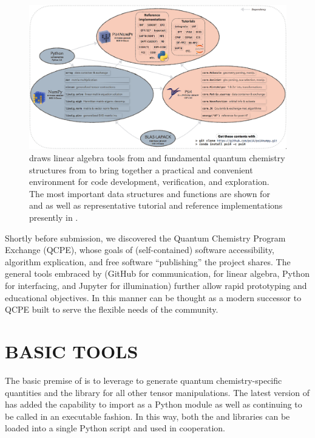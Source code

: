 \documentclass[%
  class = book,%
  crop = false,%
  float = true,%
  multi = true,%
  preview = false,%
]{standalone}
\let\cite\autocite
\newcommand{\caps}[1]{\uppercase{#1}}
\begin{document}
\begin{figure}
  \centering
  \includegraphics[width=\textwidth]{fig1.png}
  \caption[Location of \pfn within the scientific computing ecosystem]{\pfn draws linear algebra tools from \numpy and fundamental quantum chemistry structures from \pfour to bring together a practical and convenient environment for code development, verification, and exploration. The most important data structures and functions are shown for \numpy and \pfour as well as representative tutorial and reference implementations presently in \pfn.}
  \label{fig:ovalorg}
\end{figure}

Shortly before submission, we discovered the Quantum Chemistry Program Exchange (QCPE)\cite{QCPE,Boyd:2013:221}, whose goals of (self-contained) software accessibility, algorithm explication, and free software ``publishing'' the \pfn project shares. The general tools embraced by \pfn (GitHub for communication, \numpy for linear algebra, Python for interfacing, and Jupyter for illumination) further allow rapid prototyping and educational objectives. In this manner \pfn can be thought as a modern successor to QCPE built to serve the flexible needs of the community.

\section{\texorpdfstring{\caps{Basic Tools}}{Basic Tools}}

The basic premise of \pfn is to leverage \pfour to generate quantum chemistry-specific quantities and the \numpy library\cite{Varoquaux:1521-9615} for all other tensor manipulations.  The latest version of \pfour has added the capability to import \pfour as a Python module as well as continuing to be called in an executable fashion. In this way, both the \pfour and \numpy libraries can be loaded into a single Python script and used in cooperation.
\end{document}
